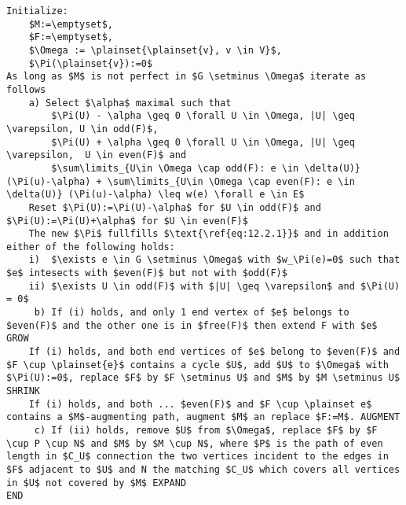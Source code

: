\begin{lstlisting}
Initialize:
	$M:=\emptyset$, 
	$F:=\emptyset$,
	$\Omega := \plainset{\plainset{v}, v \in V}$,
	$\Pi(\plainset{v}):=0$
As long as $M$ is not perfect in $G \setminus \Omega$ iterate as follows
    a) Select $\alpha$ maximal such that 
		$\Pi(U) - \alpha \geq 0 \forall U \in \Omega, |U| \geq \varepsilon, U \in odd(F)$,
		$\Pi(U) + \alpha \geq 0 \forall U \in \Omega, |U| \geq \varepsilon,  U \in even(F)$ and
		$\sum\limits_{U\in \Omega \cap odd(F): e \in \delta(U)} (\Pi(u)-\alpha) + \sum\limits_{U\in \Omega \cap even(F): e \in \delta(U)} (\Pi(u)-\alpha) \leq w(e) \forall e \in E$
	Reset $\Pi(U):=\Pi(U)-\alpha$ for $U \in odd(F)$ and $\Pi(U):=\Pi(U)+\alpha$ for $U \in even(F)$
	The new $\Pi$ fullfills $\text{\ref{eq:12.2.1}}$ and in addition either of the following holds:
	i)  $\exists e \in G \setminus \Omega$ with $w_\Pi(e)=0$ such that $e$ intesects with $even(F)$ but not with $odd(F)$
	ii) $\exists U \in odd(F)$ with $|U| \geq \varepsilon$ and $\Pi(U) = 0$
     b) If (i) holds, and only 1 end vertex of $e$ belongs to $even(F)$ and the other one is in $free(F)$ then extend F with $e$ GROW
	If (i) holds, and both end vertices of $e$ belong to $even(F)$ and $F \cup \plainset{e}$ contains a cycle $U$, add $U$ to $\Omega$ with $\Pi(U):=0$, replace $F$ by $F \setminus U$ and $M$ by $M \setminus U$ SHRINK
	If (i) holds, and both ... $even(F)$ and $F \cup \plainset e$ contains a $M$-augmenting path, augment $M$ an replace $F:=M$. AUGMENT
     c) If (ii) holds, remove $U$ from $\Omega$, replace $F$ by $F \cup P \cup N$ and $M$ by $M \cup N$, where $P$ is the path of even length in $C_U$ connection the two vertices incident to the edges in $F$ adjacent to $U$ and N the matching $C_U$ which covers all vertices in $U$ not covered by $M$ EXPAND
END
\end{lstlisting}
